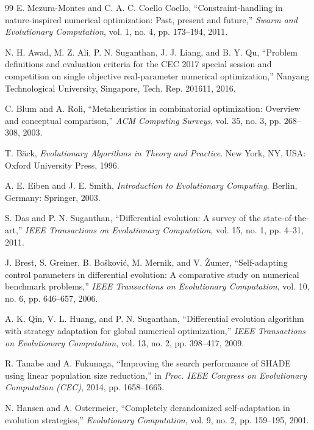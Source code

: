 \documentclass[a4paper,fleqn]{cas-sc}
\begin{document}
\begin{thebibliography}{99}
E. Mezura-Montes and C. A. C. Coello Coello, ``Constraint-handling in nature-inspired numerical optimization: Past, present and future,'' \emph{Swarm and Evolutionary Computation}, vol. 1, no. 4, pp. 173--194, 2011.

N. H. Awad, M. Z. Ali, P. N. Suganthan, J. J. Liang, and B. Y. Qu, ``Problem definitions and evaluation criteria for the CEC 2017 special session and competition on single objective real-parameter numerical optimization,'' Nanyang Technological University, Singapore, Tech. Rep. 201611, 2016.

C. Blum and A. Roli, ``Metaheuristics in combinatorial optimization: Overview and conceptual comparison,'' \emph{ACM Computing Surveys}, vol. 35, no. 3, pp. 268--308, 2003.

T. B{\"a}ck, \emph{Evolutionary Algorithms in Theory and Practice}. New York, NY, USA: Oxford University Press, 1996.

A. E. Eiben and J. E. Smith, \emph{Introduction to Evolutionary Computing}. Berlin, Germany: Springer, 2003.

S. Das and P. N. Suganthan, ``Differential evolution: A survey of the state-of-the-art,'' \emph{IEEE Transactions on Evolutionary Computation}, vol. 15, no. 1, pp. 4--31, 2011.

J. Brest, S. Greiner, B. Bo\v{s}kovi\'{c}, M. Mernik, and V. \v{Z}umer, ``Self-adapting control parameters in differential evolution: A comparative study on numerical benchmark problems,'' \emph{IEEE Transactions on Evolutionary Computation}, vol. 10, no. 6, pp. 646--657, 2006.

A. K. Qin, V. L. Huang, and P. N. Suganthan, ``Differential evolution algorithm with strategy adaptation for global numerical optimization,'' \emph{IEEE Transactions on Evolutionary Computation}, vol. 13, no. 2, pp. 398--417, 2009.

R. Tanabe and A. Fukunaga, ``Improving the search performance of SHADE using linear population size reduction,'' in \emph{Proc. IEEE Congress on Evolutionary Computation (CEC)}, 2014, pp. 1658--1665.

N. Hansen and A. Ostermeier, ``Completely derandomized self-adaptation in evolution strategies,'' \emph{Evolutionary Computation}, vol. 9, no. 2, pp. 159--195, 2001.


\end{thebibliography}
\end{document}
